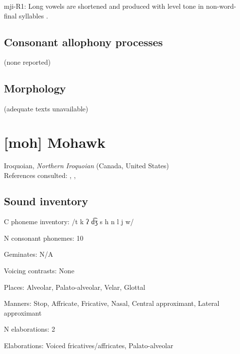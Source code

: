 {\begin{appendixdesc}
\item[mji-R1:] Long vowels are shortened and produced with level tone in non-word-final syllables \citep[117]{Clark2008}.
\end{appendixdesc}
\subsection*{Consonant allophony processes}

(none reported)

\subsection*{Morphology}

(adequate texts unavailable)

\section*{[moh] Mohawk}   %
Iroquoian, \textit{Northern Iroquoian} (Canada, United States)\medskip\\
References consulted: \citet{Bonvillain1973}, \citet{Michelson1981}, \citet{Michelson1988}
\subsection*{Sound inventory}
\begin{appendixdesc}

\item[C phoneme inventory:] /t k ʔ d͡ʒ s h n l j w/

\item[N consonant phonemes:] 10

\item[Geminates:] N/A

\item[Voicing contrasts:] None

\item[Places:] Alveolar, Palato-alveolar, Velar, Glottal

\item[Manners:] Stop, Affricate, Fricative, Nasal, Central approximant, Lateral approximant

\item[N elaborations:] 2

\item[Elaborations:] Voiced fricatives/affricates, Palato-alveolar


\end{appendixdesc}}
